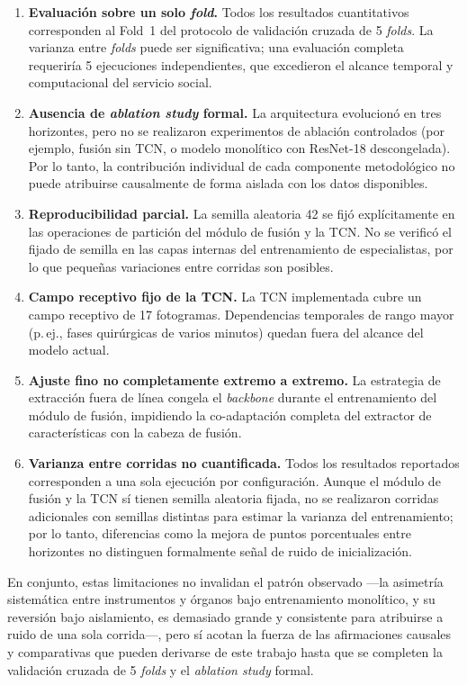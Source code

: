 \documentclass[11pt]{article}
\begin{document}
\begin{enumerate}[leftmargin=1.6em]
    \item \textbf{Evaluación sobre un solo \emph{fold}.} Todos los resultados cuantitativos corresponden al Fold~1 del protocolo de validación cruzada de 5 \emph{folds}. La varianza entre \emph{folds} puede ser significativa; una evaluación completa requeriría 5 ejecuciones independientes, que excedieron el alcance temporal y computacional del servicio social.
    \item \textbf{Ausencia de \emph{ablation study} formal.} La arquitectura evolucionó en tres horizontes, pero no se realizaron experimentos de ablación controlados (por ejemplo, fusión sin TCN, o modelo monolítico con ResNet-18 descongelada). Por lo tanto, la contribución individual de cada componente metodológico no puede atribuirse causalmente de forma aislada con los datos disponibles.
    \item \textbf{Reproducibilidad parcial.} La semilla aleatoria 42 se fijó explícitamente en las operaciones de partición del módulo de fusión y la TCN. No se verificó el fijado de semilla en las capas internas del entrenamiento de especialistas, por lo que pequeñas variaciones entre corridas son posibles.
    \item \textbf{Campo receptivo fijo de la TCN.} La TCN implementada cubre un campo receptivo de 17 fotogramas. Dependencias temporales de rango mayor (p.\,ej., fases quirúrgicas de varios minutos) quedan fuera del alcance del modelo actual.
    \item \textbf{Ajuste fino no completamente extremo a extremo.} La estrategia de extracción fuera de línea congela el \emph{backbone} durante el entrenamiento del módulo de fusión, impidiendo la co-adaptación completa del extractor de características con la cabeza de fusión.
    \item \textbf{Varianza entre corridas no cuantificada.} Todos los resultados reportados corresponden a una sola ejecución por configuración. Aunque el módulo de fusión y la TCN sí tienen semilla aleatoria fijada, no se realizaron corridas adicionales con semillas distintas para estimar la varianza del entrenamiento; por lo tanto, diferencias como la mejora de puntos porcentuales entre horizontes no distinguen formalmente señal de ruido de inicialización.
\end{enumerate}

En conjunto, estas limitaciones no invalidan el patrón observado —la asimetría sistemática entre instrumentos y órganos bajo entrenamiento monolítico, y su reversión bajo aislamiento, es demasiado grande y consistente para atribuirse a ruido de una sola corrida—, pero sí acotan la fuerza de las afirmaciones causales y comparativas que pueden derivarse de este trabajo hasta que se completen la validación cruzada de 5 \emph{folds} y el \emph{ablation study} formal.
\end{document}
